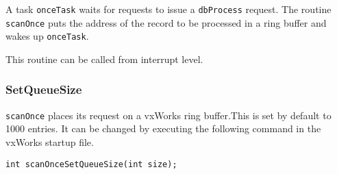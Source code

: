 A task \verb|onceTask| waits for requests to issue a \verb|dbProcess| request. The routine \verb|scanOnce| puts the address of the 
record to be processed in a ring buffer and wakes up \verb|onceTask|.

This routine can be called from interrupt level.

\subsubsection{SetQueueSize}

\verb|scanOnce| places its request on a vxWorks ring buffer.This is set by default to 1000 entries. It can be changed by 
executing the following command in the vxWorks startup file.

\begin{verbatim}
int scanOnceSetQueueSize(int size);
\end{verbatim}











